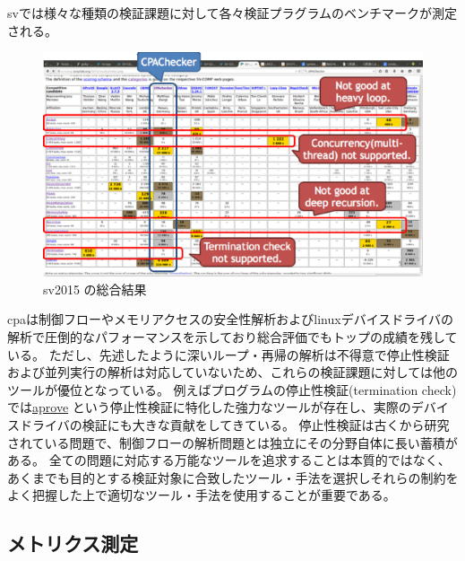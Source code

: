 \acrshort{sv}では様々な種類の検証課題に対して各々検証プラグラムのベンチマークが測定される。
\begin{figure}[ht]
  \centering
  \includegraphics[width=\textwidth]{pic/svcomp.eps}
  \caption{\gls{sv}2015 の総合結果}
  \label{svcomp}
\end{figure}
\par
\acrshort{cpa}は制御フローやメモリアクセスの安全性解析および\acrshort{linux}デバイスドライバの解析で圧倒的なパフォーマンスを示しており総合評価でもトップの成績を残している。
ただし、先述したように深いループ・再帰の解析は不得意で停止性検証および並列実行の解析は対応していないため、これらの検証課題に対しては他のツールが優位となっている。
例えばプログラムの停止性検証(termination check)では\href{http://aprove.informatik.rwth-aachen.de}{\gls{aprove}} \cite{aprove}という停止性検証に特化した強力なツールが存在し、実際のデバイスドライバの検証にも大きな貢献をしてきている。
停止性検証は古くから研究されている問題で、制御フローの解析問題とは独立にその分野自体に長い蓄積がある。
全ての問題に対応する万能なツールを追求することは本質的ではなく、あくまでも目的とする検証対象に合致したツール・手法を選択しそれらの制約をよく把握した上で適切なツール・手法を使用することが重要である。
\subsection{メトリクス測定}
